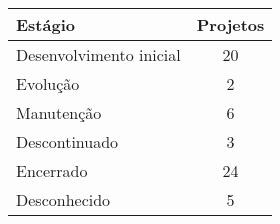 \begin{tabular}{l c}
  \hline
  {\bf Estágio} & {\bf Projetos} \\
  \hline
    Desenvolvimento inicial & 20 \\
    Evolução & 2 \\
    Manutenção & 6 \\
    Descontinuado & 3 \\
    Encerrado & 24 \\
    Desconhecido & 5 \\
  \hline
\end{tabular}
